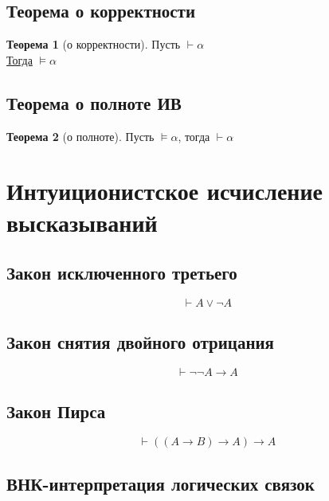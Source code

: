 \documentclass[english]{article}
\theoremstyle{plain}
\theoremstyle{remark}
\theoremstyle{definition}
\newtheorem{theorem}{Теорема}[section]
\begin{document}
\subsection{Теорема о корректности}
\label{sec:orgc26f2d9}
\begin{theorem}[о корректности]
Пусть \(\vdash \alpha\) \\
\uline{Тогда} \(\vDash \alpha\)
\label{org43ed26c}
\end{theorem}
\subsection{Теорема о полноте ИВ}
\label{sec:orgd05a430}
\begin{theorem}[о полноте]
Пусть \(\vDash \alpha\), тогда \(\vdash \alpha\)
\label{orge043c8e}
\end{theorem}
\section{Интуиционистское исчисление высказываний}
\label{sec:org2777334}
\subsection{Закон исключенного третьего}
\label{sec:orgf31fa0b}
\[ \vdash A \vee \neg A \]
\subsection{Закон снятия двойного отрицания}
\label{sec:org069d72d}
\[ \vdash \neg\neg A \to A \]
\subsection{Закон Пирса}
\label{sec:orga936c0b}
\[ \vdash ((A \to B) \to A) \to A \]
\subsection{ВНК-интерпретация логических связок}
\label{sec:orga5e88e0}
\end{document}
